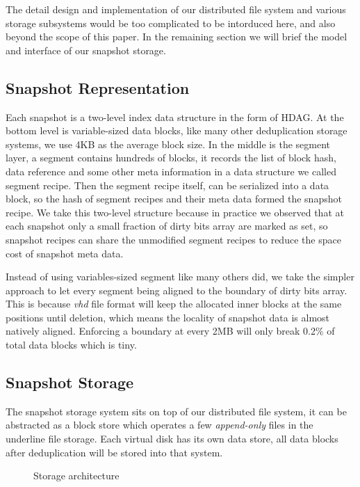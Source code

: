 The detail design and implementation of our distributed file system and various 
storage subsystems would be too complicated to be intorduced here, and also beyond
the scope of this paper. In the remaining section we will brief the model and interface of 
our snapshot storage.

\subsection{Snapshot Representation}
Each snapshot is a two-level index data structure in the form of HDAG. 
At the bottom level is variable-sized data blocks, like many other deduplication storage systems, 
we use 4KB as the average block size.
In the middle is the segment layer, a segment contains hundreds of blocks, it records the list
of block hash, data reference and some other meta information in a data structure we called
segment recipe. Then the segment recipe itself, can be serialized into a data block, so the hash
of segment recipes and their meta data formed the snapshot recipe. We take this two-level
structure because in practice we observed that at each snapshot only a small fraction
of dirty bits array are marked as set, so snapshot recipes can share the unmodified
segment recipes to reduce the space cost of snapshot meta data.

Instead of using variables-sized segment like many others did, we take the simpler approach
to let every segment being aligned to the boundary of dirty bits array. This is because
\emph{vhd} file format will keep the allocated inner blocks at the same positions until deletion,
which means the locality of snapshot data is almost natively aligned. Enforcing a boundary at every 2MB will
only break 0.2\% of total data blocks which is tiny.

\subsection{Snapshot Storage}
The snapshot storage system sits on top of our distributed file system, 
it can be abstracted as a block store which operates a few \emph{append-only} files
in the underline file storage. Each virtual disk has its own data store, all data 
blocks after deduplication will be stored into that system.

\begin{figure}
  \centering
  \caption{Storage architecture}
  \label{fig:arch}
\end{figure}

